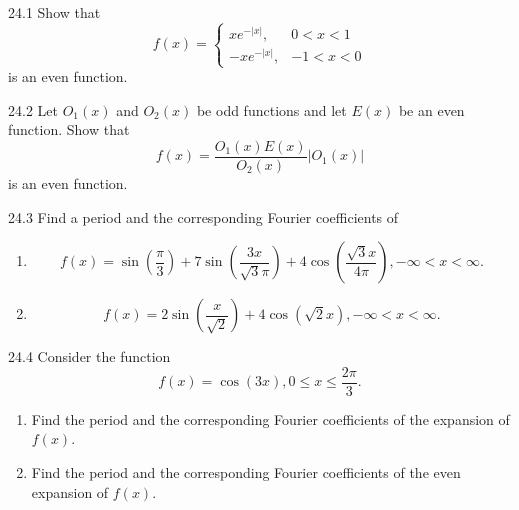 
\begin{problem}{24.1}
  Show that
  \begin{equation*}
    f(x) = \begin{cases}
      xe^{-\left| x \right|}, & 0 < x < 1\\
    - x e^{-|x|}, & -1 < x < 0
    \end{cases}
  \end{equation*}
  is an even function.
\end{problem}

\begin{problem}{24.2}
  Let $O_1(x)$ and $O_2(x)$ be odd functions and let $E(x)$ be an even function.
  Show that
  \begin{equation*}
    f(x) = \frac{O_1(x) E(x)}{O_2(x)} \left| O_1(x) \right|
  \end{equation*}
  is an even function.
\end{problem}

\begin{problem}{24.3}
  Find a period and the corresponding Fourier coefficients of
  \begin{enumerate}[label=\alph*)]
    \item 
      \begin{equation*}
        f(x) = \sin \left( \frac{\pi}{3} \right) + 7 \sin \left( \frac{3x}{\sqrt{3}\pi} \right) + 4 \cos \left( \frac{\sqrt{3}x}{4\pi} \right), -\infty < x < \infty
      .\end{equation*}
    \item
      \begin{equation*}
        f(x) = 2 \sin \left( \frac{x}{\sqrt{2}} \right) + 4 \cos \left( \sqrt{2}x \right), - \infty < x <\infty
      .\end{equation*}
  \end{enumerate}
\end{problem}

\begin{problem}{24.4}
  Consider the function
  \begin{equation*}
    f(x) = \cos (3x), 0 \leq x \leq \frac{2\pi}{3}
  .\end{equation*}
  \begin{enumerate}[label=\alph*)]
    \item Find the period and the corresponding Fourier coefficients of the expansion of $f(x)$.
    \item Find the period and the corresponding Fourier coefficients of the even expansion of $f(x)$.
  \end{enumerate}
\end{problem}

